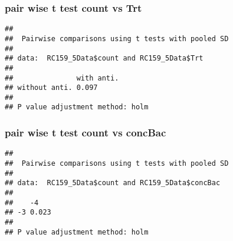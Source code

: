 \documentclass[
]{article}
\begin{document}
\hypertarget{pair-wise-t-test-count-vs-trt}{%
\subsubsection{pair wise t test count vs
Trt}\label{pair-wise-t-test-count-vs-trt}}

\begin{verbatim}
## 
##  Pairwise comparisons using t tests with pooled SD 
## 
## data:  RC159_5Data$count and RC159_5Data$Trt 
## 
##               with anti.
## without anti. 0.097     
## 
## P value adjustment method: holm
\end{verbatim}

\hypertarget{pair-wise-t-test-count-vs-concbac}{%
\subsubsection{pair wise t test count vs
concBac}\label{pair-wise-t-test-count-vs-concbac}}

\begin{verbatim}
## 
##  Pairwise comparisons using t tests with pooled SD 
## 
## data:  RC159_5Data$count and RC159_5Data$concBac 
## 
##    -4   
## -3 0.023
## 
## P value adjustment method: holm
\end{verbatim}
\end{document}
